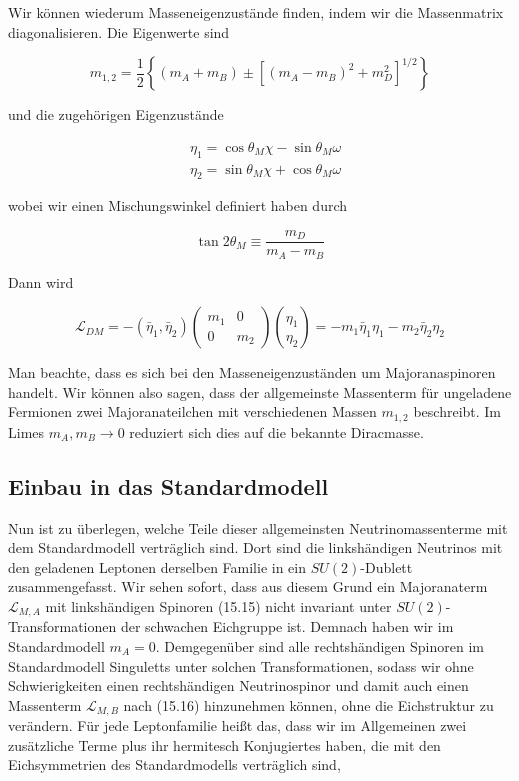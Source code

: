 \documentclass[10pt, letterpaper]{article}
\begin{document}
Wir können wiederum Masseneigenzustände finden, indem wir die Massenmatrix diagonalisieren. Die Eigenwerte sind

$$
m_{1,2}=\frac{1}{2}\left\{\left(m_{A}+m_{B}\right) \pm\left[\left(m_{A}-m_{B}\right)^{2}+m_{D}^{2}\right]^{1 / 2}\right\}
$$

und die zugehörigen Eigenzustände

$$
\begin{aligned}
& \eta_{1}=\cos \theta_{M} \chi-\sin \theta_{M} \omega \\
& \eta_{2}=\sin \theta_{M} \chi+\cos \theta_{M} \omega
\end{aligned}
$$

wobei wir einen Mischungswinkel definiert haben durch

$$
\tan 2 \theta_{M} \equiv \frac{m_{D}}{m_{A}-m_{B}}
$$

Dann wird

$$
\mathscr{L}_{D M}=-\left(\bar{\eta}_{1}, \bar{\eta}_{2}\right)\left(\begin{array}{cc}
m_{1} & 0 \\
0 & m_{2}
\end{array}\right)\binom{\eta_{1}}{\eta_{2}}=-m_{1} \bar{\eta}_{1} \eta_{1}-m_{2} \bar{\eta}_{2} \eta_{2}
$$

Man beachte, dass es sich bei den Masseneigenzuständen um Majoranaspinoren handelt. Wir können also sagen, dass der allgemeinste Massenterm für ungeladene Fermionen zwei Majoranateilchen mit verschiedenen Massen $m_{1,2}$ beschreibt. Im Limes $m_{A}, m_{B} \rightarrow 0$ reduziert sich dies auf die bekannte Diracmasse.

\subsection*{Einbau in das Standardmodell}
Nun ist zu überlegen, welche Teile dieser allgemeinsten Neutrinomassenterme mit dem Standardmodell verträglich sind. Dort sind die linkshändigen Neutrinos mit den geladenen Leptonen derselben Familie in ein $S U(2)$-Dublett zusammengefasst. Wir sehen sofort, dass aus diesem Grund ein Majoranaterm $\mathscr{L}_{M, A}$ mit linkshändigen Spinoren (15.15) nicht invariant unter $S U(2)$-Transformationen der schwachen Eichgruppe ist. Demnach haben wir im Standardmodell $m_{A}=0$. Demgegenüber sind alle rechtshändigen Spinoren im Standardmodell Singuletts unter solchen Transformationen, sodass wir ohne Schwierigkeiten einen rechtshändigen Neutrinospinor und damit auch einen Massenterm $\mathscr{L}_{M, B}$ nach (15.16) hinzunehmen können, ohne die Eichstruktur zu verändern. Für jede Leptonfamilie heißt das, dass wir im Allgemeinen zwei zusätzliche Terme plus ihr hermitesch Konjugiertes haben, die mit den Eichsymmetrien des Standardmodells verträglich sind,
\end{document}
